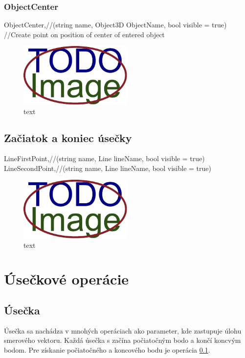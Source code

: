 \subsubsection{ObjectCenter}
		ObjectCenter,//(string name, Object3D ObjectName, bool visible = true) //Create point on position of center of entered object

\begin{figure}[H]
	\centering
	\includegraphics[width=0.5\textwidth]{obrazky-figures/placeholder.pdf}
	\caption{text}
	\label{fig:1}
\end{figure}

\subsection{Začiatok a koniec úsečky}
\label{sec:begandendofline}

		LineFirstPoint,//(string name, Line lineName, bool visible = true)
		LineSecondPoint,//(string name, Line lineName, bool visible = true)


\begin{figure}[H]
	\centering
	\includegraphics[width=0.5\textwidth]{obrazky-figures/placeholder.pdf}
	\caption{text}
	\label{fig:1}
\end{figure}



	






\section{Úsečkové operácie}


\subsection{Úsečka}
Úsečka sa nachádza v mnohých operáciach ako parameter, kde zastupuje úlohu smerového vektoru. Každá úsečka s začína počiatočným bodo a končí koncvým bodom. Pre získanie počiatočného a koncového bodu je operácia \ref{sec:begandendofline}.

